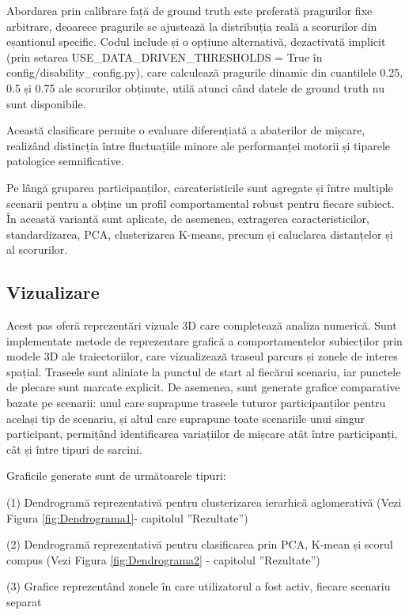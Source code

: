 \documentclass[12pt,a4paper]{report}
\theoremstyle{definition}
\theoremstyle{remark}
\begin{document}
Abordarea prin calibrare față de ground truth este preferată pragurilor fixe arbitrare, deoarece pragurile se ajustează la distribuția reală a scorurilor din eșantionul specific. Codul include și o opțiune alternativă, dezactivată implicit (prin setarea USE\_DATA\_DRIVEN\_THRESHOLDS = True în config/disability\_config.py), care calculează pragurile dinamic din cuantilele 0.25, 0.5 și 0.75 ale scorurilor obținute, utilă atunci când datele de ground truth nu sunt disponibile.

Această clasificare permite o evaluare diferențiată a abaterilor de mișcare, realizând distincția între fluctuațiile minore ale performanței motorii și tiparele patologice semnificative. 

Pe lângă gruparea participanților, carcateristicile sunt agregate și între multiple scenarii pentru a obține un profil comportamental robust pentru fiecare subiect. În această variantă sunt aplicate, de asemenea, extragerea caracteristicilor, standardizarea, PCA, clusterizarea K-means, precum și caluclarea distanțelor și al scorurilor.

\subsection{Vizualizare}

Acest pas oferă reprezentări vizuale 3D care completează analiza numerică. Sunt implementate metode de reprezentare grafică a comportamentelor subiecților prin modele 3D ale traiectoriilor, care vizualizează traseul parcurs și zonele de interes spațial. Traseele sunt aliniate la punctul de start al fiecărui scenariu, iar punctele de plecare sunt marcate explicit. De asemenea, sunt generate grafice comparative bazate pe scenarii: unul care suprapune traseele tuturor participanților pentru același tip de scenariu, și altul care suprapune toate scenariile unui singur participant, permițând identificarea variațiilor de mișcare atât între participanți, cât și între tipuri de sarcini.

Graficile generate sunt de următoarele tipuri:

(1) Dendrogramă reprezentativă pentru clusterizarea ierarhică aglomerativă (Vezi Figura \ref{fig:Dendrograma1}- capitolul ”Rezultate”)

(2) Dendrogramă reprezentativă pentru clasificarea prin PCA, K-mean și scorul compus (Vezi Figura \ref{fig:Dendrograma2} - capitolul ”Rezultate”)

(3) Grafice reprezentând zonele în care utilizatorul a fost activ, fiecare scenariu separat
\end{document}
